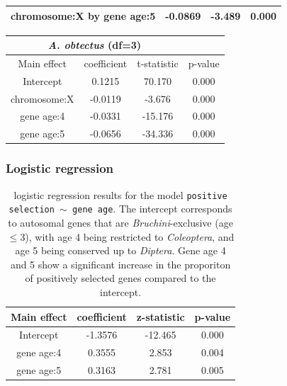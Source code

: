 \documentclass{article}
\begin{document}
\begin{table}[H]
\begin{tabular}{c |c | c|c}
        \hline
        chromosome:X by gene age:5 & -0.0869 & -3.489 & 0.000 \\
        \hline
    \end{tabular}
    \hspace{0.5cm}
    \begin{tabular}{c |c | c|c}
        \multicolumn{3}{c}{\textit{A. obtectus} (df=3)}\\
        \hline
        Main effect & coefficient & t-statistic & p-value \\
        \hline
        \hline
        Intercept & 0.1215 &  70.170 & 0.000 \\
        \hline
        chromosome:X & -0.0119 & -3.676 & 0.000 \\
        \hline
        gene age:4 & -0.0331 & -15.176 & 0.000 \\
        \hline
        gene age:5 & -0.0656 & -34.336 & 0.000 \\
        \hline
    \end{tabular}
\end{table}

\subsubsection*{Logistic regression}

\begin{table}[H]
    \centering
    \caption{logistic regression results for the model \texttt{positive selection $\sim$ gene age}. 
    The intercept corresponds to autosomal genes that are \textit{Bruchini}-exclusive (age$\leq$3), with age 4 being restricted to 
    \textit{Coleoptera}, and age 5 being conserved up to \textit{Diptera}. Gene age 4 and 5 show a significant increase in the proporiton 
    of positively selected genes compared to the intercept.}
    \label{SItab:conservation}
    \begin{tabular}{c |c | c|c}
        Main effect & coefficient & z-statistic & p-value \\
        \hline
        \hline
        Intercept & -1.3576 & -12.465 & 0.000\\
        \hline
        gene age:4 &  0.3555 &   2.853 & 0.004\\
        \hline
        gene age:5 &  0.3163 &   2.781 & 0.005\\
        \hline
    \end{tabular}
\end{table}
\end{document}
